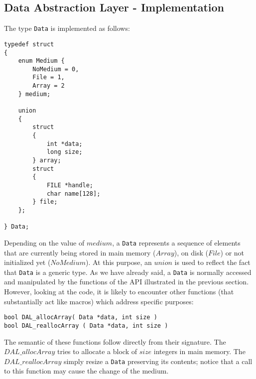 \subsection*{Data Abstraction Layer - Implementation}
The type \texttt{Data} is implemented as follows:
\begin{lstlisting}
typedef struct
{
	enum Medium {
		NoMedium = 0,
		File = 1,
		Array = 2
	} medium;
	
	union
	{
		struct
		{
			int *data;
			long size;
		} array;
		struct
		{
			FILE *handle;
			char name[128];
		} file;
	};
	
} Data;
\end{lstlisting}
Depending on the value of $medium$, a \texttt{Data} represents a sequence of elements that are currently being stored in main memory ($Array$), on disk ($File$) or not initialized yet ($NoMedium$). At this purpose, an $union$ is used to reflect the fact that \texttt{Data} is a generic type.  As we have already said, a \texttt{Data} is normally accessed and manipulated by the functions of the API illustrated in the previous section. However, looking at the code, it is likely to encounter other functions (that substantially act like macros) which address specific purposes: 
\begin{lstlisting}
bool DAL_allocArray( Data *data, int size )
bool DAL_reallocArray ( Data *data, int size )
\end{lstlisting}
The semantic of these functions follow directly from their signature. The $DAL\_allocArray$ tries to allocate a block of $size$ integers in main memory. The $DAL\_reallocArray$ simply resize a \texttt{Data} preserving its contents; notice that a call to this function may cause the change of the medium. 

